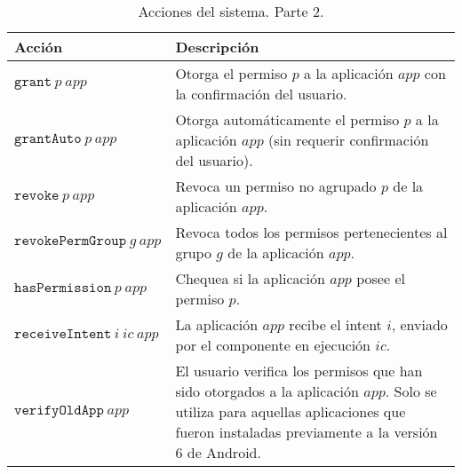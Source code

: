 \begin{table}
    \label{table:actions:second}
    \begin{tabularx}{\linewidth}{|l X|}
        \hline
        \textbf{Acción}                   & \textbf{Descripción}                                                                                                                                                                   \\
        \hline
        $\mathtt{grant}~p~app$            & Otorga el permiso $p$ a la aplicación $app$ con la confirmación del usuario.                                                                                                           \\
        \hline
        $\mathtt{grantAuto}~p~app$        & Otorga automáticamente el permiso $p$ a la aplicación $app$ (sin requerir confirmación del usuario).                                                                                   \\
        \hline
        $\mathtt{revoke}~p~app$           & Revoca un permiso no agrupado $p$ de la aplicación $app$.                                                                                                                              \\
        \hline
        $\mathtt{revokePermGroup}~g~app$  & Revoca todos los permisos pertenecientes al grupo $g$ de la aplicación $app$.                                                                                                          \\
        \hline
        $\mathtt{hasPermission}~p~app$    & Chequea si la aplicación $app$ posee el permiso $p$.                                                                                                                                   \\
        \hline
        $\mathtt{receiveIntent}~i~ic~app$ & La aplicación $app$ recibe el intent $i$, enviado por el componente en ejecución $ic$.                                                                                                 \\
        \hline
        $\mathtt{verifyOldApp}~app$       & El usuario verifica los permisos que han sido otorgados a la aplicación $app$. Solo se utiliza para aquellas aplicaciones que fueron instaladas previamente a la versión 6 de Android. \\
        \hline
    \end{tabularx}
    \caption{Acciones del sistema. Parte 2.}
\end{table}